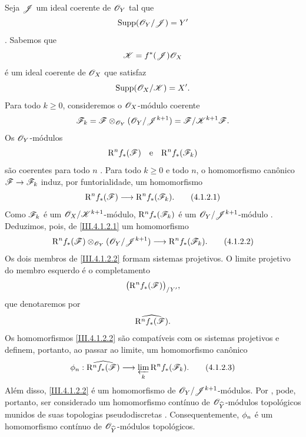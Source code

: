 \begin{env}[4.1.2]
\label{III.4.1.2}
Seja $\mathscr{J}$ um ideal coerente de $\mathscr{O}_Y$ tal que
\[
  \operatorname{Supp}(\mathscr{O}_Y/\mathscr{J})=Y'
\]
.
Sabemos  que
\[
  \mathscr{K}=f^*(\mathscr{J})\mathscr{O}_X
\]
é um ideal coerente de $\mathscr{O}_X$ que satisfaz
\[
  \operatorname{Supp}(\mathscr{O}_X/\mathscr{K})=X'.
\]
Para todo $k\geq0$, consideremos o $\mathscr{O}_X$-módulo coerente
\[
  \mathscr{F}_k
  =
  \mathscr{F}\otimes_{\mathscr{O}_Y}(\mathscr{O}_Y/\mathscr{J}^{k+1})
  =
  \mathscr{F}/\mathscr{K}^{k+1}\mathscr{F}.
\]
Os $\mathscr{O}_Y$-módulos
\[
  \mathrm{R}^n f_*(\mathscr{F})
  \quad\text{e}\quad
  \mathrm{R}^n f_*(\mathscr{F}_k)
\]
são coerentes para todo $n$ .
Para todo $k\geq0$ e todo $n$, o homomorfismo canônico
$\sh{F}\to\sh{F}_k$ induz, por funtorialidade, um homomorfismo
\[
  \RR^n f_*(\sh{F})
  \longrightarrow
  \RR^n f_*(\sh{F}_k).
  \tag{4.1.2.1}
  \label{III.4.1.2.1}
\]
Como $\mathscr{F}_k$ é um $\mathscr{O}_X/\mathscr{K}^{k+1}$-módulo,
$\mathrm{R}^n f_*(\mathscr{F}_k)$ é um
$\mathscr{O}_Y/\mathscr{J}^{k+1}$-módulo .
Deduzimos, pois, de \eqref{III.4.1.2.1} um homomorfismo
\[
  \RR^n f_*(\sh{F})
  \otimes_{\sh{O}_Y}(\sh{O}_Y/\sh{J}^{k+1})
  \longrightarrow
  \RR^n f_*(\sh{F}_k).
  \tag{4.1.2.2}
  \label{III.4.1.2.2}
\]
Os dois membros de \eqref{III.4.1.2.2} formam sistemas projetivos.
O limite projetivo do membro esquerdo é o completamento
\[
  \bigl(\mathrm{R}^n f_*(\mathscr{F})\bigr)_{/Y'},
\]
que denotaremos por
\[
  \widehat{\mathrm{R}^n f_*(\mathscr{F})}.
\]
Os homomorfismos \eqref{III.4.1.2.2} são compatíveis com os sistemas
projetivos e definem, portanto, ao passar ao limite, um homomorfismo
canônico
\[
  \vphi_n:
  \widehat{\RR^n f_*(\sh{F})}
  \longrightarrow
  \varprojlim_k\RR^n f_*(\sh{F}_k).
  \tag{4.1.2.3}
  \label{III.4.1.2.3}
\]
Além disso, \eqref{III.4.1.2.2} é um homomorfismo de
$\mathscr{O}_Y/\mathscr{J}^{k+1}$-módulos.
Por , pode, portanto, ser considerado um
homomorfismo contínuo de $\mathscr{O}_{\widehat{Y}}$-módulos topológicos
munidos de suas topologias pseudodiscretas .
Consequentemente, $\phi_n$ é um homomorfismo contínuo de
$\mathscr{O}_{\widehat{Y}}$-módulos topológicos.
\end{env}

